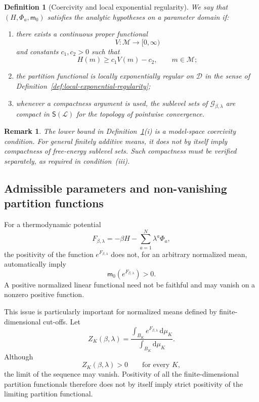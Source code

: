 \documentclass[11pt,reqno]{amsart}
\newtheorem{Definition}[Theorem]{Definition}
\newtheorem{rem}[Theorem]{Remark}
\begin{document}
\begin{Definition}[Coercivity and local exponential regularity]
\label{def:coercive}
We say that $(H,\Phi_a,\mathsf m_0)$ satisfies the analytic hypotheses
on a parameter domain if:
\begin{enumerate}
\item[\textup{(i)}] there exists a continuous proper functional
\[
V\colon\mathcal M\longrightarrow[0,\infty)
\]
and constants $c_1,c_2>0$ such that
\[
H(m)\geq c_1V(m)-c_2,
\qquad
m\in\mathcal M;
\]
\item[\textup{(ii)}] the partition functional is locally exponentially
regular on $\mathcal D$ in the sense of
Definition~\ref{def:local-exponential-regularity};
\item[\textup{(iii)}] whenever a compactness argument is used, the
sublevel sets of $\mathcal G_{\beta,\lambda}$ are compact in
$\mathsf S(\mathcal L)$ for the topology of pointwise convergence.
\end{enumerate}
\end{Definition}

\begin{rem}
The lower bound in Definition~\ref{def:coercive}\textup{(i)} is a
model-space coercivity condition. For general finitely additive means,
it does not by itself imply compactness of free-energy sublevel sets.
Such compactness must be verified separately, as required in
condition~\textup{(iii)}.
\end{rem}

\subsection{Admissible parameters and non-vanishing partition functions}
\label{subsec:admissible-partition}

For a thermodynamic potential
\[
F_{\beta,\lambda}
=
-\beta H-\sum_{a=1}^{N}\lambda^a\Phi_a,
\]
the positivity of the function $e^{F_{\beta,\lambda}}$ does not, for an
arbitrary normalized mean, automatically imply
\[
\mathsf m_0(e^{F_{\beta,\lambda}})>0.
\]
A positive normalized linear functional need not be faithful and may
vanish on a nonzero positive function.

This issue is particularly important for normalized means defined by
finite-dimensional cut-offs. Let
\[
Z_K(\beta,\lambda)
=
\frac{
\displaystyle
\int_{B_K}
e^{F_{\beta,\lambda}}\,\mathrm d\mu_K
}{
\displaystyle
\int_{B_K}\mathrm d\mu_K
}.
\]
Although
\[
Z_K(\beta,\lambda)>0
\qquad
\text{for every }K,
\]
the limit of the sequence may vanish. Positivity of all the
finite-dimensional partition functionals therefore does not by itself
imply strict positivity of the limiting partition functional.
\end{document}
